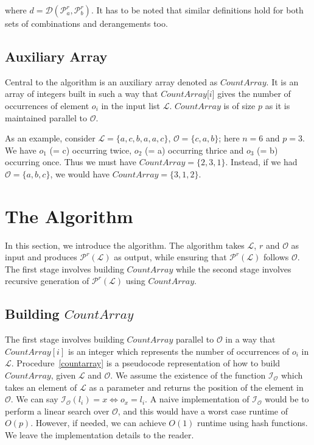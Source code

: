 \documentclass{article}
\begin{document}
where $d = \mathcal{D}(\mathcal{P}^r_a, \mathcal{P}^r_b)$. It has to be noted that similar definitions hold for both sets of combinations and derangements too.

\subsection{Auxiliary Array}
\label{hashorder}

Central to the algorithm is an auxiliary array denoted as $CountArray$. It is an array of integers built in such a way that $CountArray$[$i$] gives the number of occurrences of element $o_i$ in the {input list $\mathcal{L}$}. $CountArray$ is of size $p$ as it is maintained parallel to $\mathcal{O}$.

As an example, consider $\mathcal{L} = \{a,c,b,a,a,c\}$, $\mathcal{O} = \{c,a,b\}$; here $n = 6$ and $p = 3$. We have $o_1$ (= c) occurring twice, $o_2$ (= a) occurring thrice and $o_3$ (= b) occurring once. Thus we must have $CountArray = \{2,3,1\}$. Instead, if we had $\mathcal{O} = \{a,b,c\}$, we would have $CountArray = \{3,1,2\}$.

\section{The Algorithm}
\label{sec:algo}

In this section, we introduce the algorithm. The algorithm takes $\mathcal{L}$, $r$ and $\mathcal{O}$ as input and produces $\mathcal{P}^r(\mathcal{L})$ as output, while ensuring that $\mathcal{P}^r(\mathcal{L})$ follows $\mathcal{O}$. The first stage involves building $CountArray$ while the second stage involves recursive generation of $\mathcal{P}^r(\mathcal{L})$ using $CountArray$.

\subsection{Building $CountArray$}

The first stage involves building $CountArray$ parallel to $\mathcal{O}$ in a way that $CountArray[i]$ is an integer which represents the number of occurrences of $o_i$ in $\mathcal{L}$. Procedure~\ref{countarray} is a pseudocode representation of how to build $CountArray$, given $\mathcal{L}$ and $\mathcal{O}$. We assume the existence of the function $\mathcal{I}_{\mathcal{O}}$ which takes an element of $\mathcal{L}$ as a parameter and returns the position of the element in $\mathcal{O}$. We can say ${\mathcal{I}_{\mathcal{O}}(l_i)} = x \Leftrightarrow o_x = l_i$. A naive implementation of $\mathcal{I}_{\mathcal{O}}$ would be to perform a linear search over $\mathcal{O}$, and this would have a worst case runtime of $O(p)$. However, if needed, we can achieve $O(1)$ runtime using hash functions. We leave the implementation details to the reader.
\end{document}
